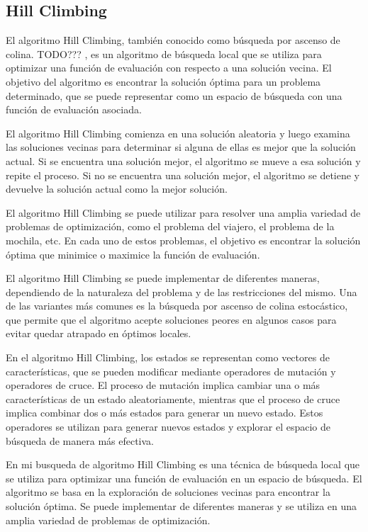 \subsection{Hill Climbing}

El algoritmo Hill Climbing, también conocido como búsqueda por ascenso de colina. TODO??? , es un algoritmo de búsqueda local que se utiliza para optimizar una función de evaluación con respecto a una solución vecina. El objetivo del algoritmo es encontrar la solución óptima para un problema determinado, que se puede representar como un espacio de búsqueda con una función de evaluación asociada.

El algoritmo Hill Climbing comienza en una solución aleatoria y luego examina las soluciones vecinas para determinar si alguna de ellas es mejor que la solución actual. Si se encuentra una solución mejor, el algoritmo se mueve a esa solución y repite el proceso. Si no se encuentra una solución mejor, el algoritmo se detiene y devuelve la solución actual como la mejor solución.

El algoritmo Hill Climbing se puede utilizar para resolver una amplia variedad de problemas de optimización, como el problema del viajero, el problema de la mochila, etc. En cada uno de estos problemas, el objetivo es encontrar la solución óptima que minimice o maximice la función de evaluación.

El algoritmo Hill Climbing se puede implementar de diferentes maneras, dependiendo de la naturaleza del problema y de las restricciones del mismo. Una de las variantes más comunes es la búsqueda por ascenso de colina estocástico, que permite que el algoritmo acepte soluciones peores en algunos casos para evitar quedar atrapado en óptimos locales.

En el algoritmo Hill Climbing, los estados se representan como vectores de características, que se pueden modificar mediante operadores de mutación y operadores de cruce. El proceso de mutación implica cambiar una o más características de un estado aleatoriamente, mientras que el proceso de cruce implica combinar dos o más estados para generar un nuevo estado. Estos operadores se utilizan para generar nuevos estados y explorar el espacio de búsqueda de manera más efectiva.

En mi busqueda de algoritmo Hill Climbing es una técnica de búsqueda local que se utiliza para optimizar una función de evaluación en un espacio de búsqueda. El algoritmo se basa en la exploración de soluciones vecinas para encontrar la solución óptima. Se puede implementar de diferentes maneras y se utiliza en una amplia variedad de problemas de optimización.


